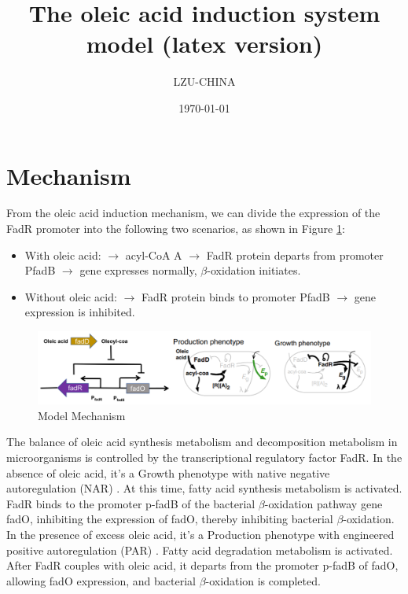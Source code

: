 \documentclass[UTF8]{article}
\title{The oleic acid induction system model (latex version)}
\author{LZU-CHINA}
\date{\today}
\begin{document}
    \maketitle
    \begin{abstract}

    \end{abstract}

\section{Mechanism}

From the oleic acid induction mechanism, we can divide the expression of the FadR promoter into the following two scenarios, as shown in Figure \ref{fig:Mechanism}:
\begin{itemize}
	\item With oleic acid: $\rightarrow$ acyl-CoA A $\rightarrow$ FadR protein departs from promoter PfadB $\rightarrow$ gene expresses normally, $\beta$-oxidation initiates.
	\item Without oleic acid: $\rightarrow$ FadR protein binds to promoter PfadB $\rightarrow$ gene expression is inhibited.
\end{itemize}

\begin{figure}[h]
	\centering
	\includegraphics[width=0.8\linewidth]{figures/mech.png}
	\caption{Model Mechanism}
	\label{fig:Mechanism}
\end{figure}
The balance of oleic acid synthesis metabolism and decomposition metabolism in microorganisms is controlled by the transcriptional regulatory factor FadR. In the absence of oleic acid, it's a Growth phenotype with native negative autoregulation (NAR) . At this time, fatty acid synthesis metabolism is activated. FadR binds to the promoter p-fadB of the bacterial $\beta$-oxidation pathway gene fadO, inhibiting the expression of fadO, thereby inhibiting bacterial $\beta$-oxidation. In the presence of excess oleic acid, it's a Production phenotype with engineered positive autoregulation (PAR) . Fatty acid degradation metabolism is activated. After FadR couples with oleic acid, it departs from the promoter p-fadB of fadO, allowing fadO expression, and bacterial $\beta$-oxidation is completed.
\end{document}
